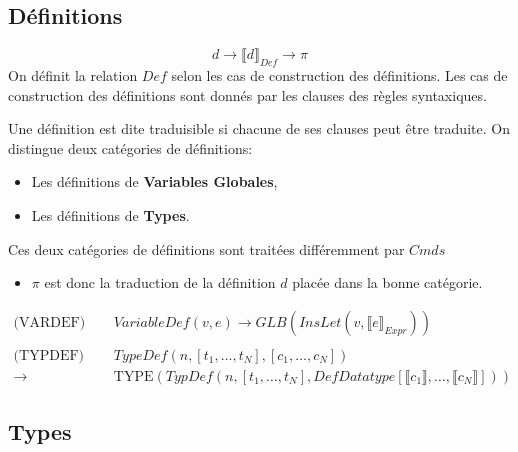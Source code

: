 \documentclass[
  12pt,
]{article}
\providecommand{\tightlist}{%
  \setlength{\itemsep}{0pt}\setlength{\parskip}{0pt}}
\begin{document}
\subsection{Définitions}\label{duxe9finitions}

\[  d \rightarrow \llbracket d \rrbracket_{Def} \rightarrow \pi \] On définit la relation
\(Def\) selon les cas de construction des définitions. Les cas de
construction des définitions sont donnés par les clauses des règles
syntaxiques.

Une définition est dite traduisible si chacune de ses clauses peut être
traduite. On distingue deux catégories de définitions:

\begin{itemize}
  \tightlist
  \item
        Les définitions de \textbf{Variables Globales},
  \item
        Les définitions de \textbf{Types}.
\end{itemize}

Ces deux catégories de définitions sont traitées différemment par \({Cmds}\)

\begin{itemize}
  \tightlist
  \item
        \(\pi\) est donc la traduction de la définition \(d\) placée dans la
        bonne catégorie.
\end{itemize}
\begin{align*}
  \text{(VARDEF)}
  \quad                  & VariableDef(v, e) \rightarrow  GLB(InsLet(v, \llbracket e \rrbracket_{Expr}))                                   \\
  \\
  \text{(TYPDEF) } \quad & TypeDef(n, [t_1,\dots,t_N], [c_1,\dots,c_N])                                                                    \\
  \rightarrow \;         & \text{TYPE}(TypDef(n, [t_1,\dots,t_N], DefDatatype[\llbracket c_1 \rrbracket,\dots,\llbracket c_N \rrbracket]))
\end{align*}
\subsection{Types}\label{types-2}
\end{document}
